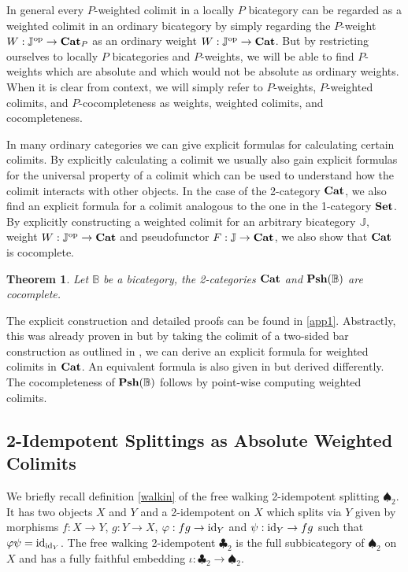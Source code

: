 \documentclass[12pt,oneside,reqno,a4paper]{article}
\newtheorem{theorem}{Theorem}[section]
\theoremstyle{definition}
\newcommand{\op}{^\textup{op}}
\newcommand{\Set}{\textbf{\textup{Set}}}
\newcommand{\Cat}{\textbf{\textup{Cat}}}
\newcommand{\Psh}[1]{\textbf{\textup{Psh}}(#1)}
\newcommand{\clb}{\clubsuit}
\newcommand{\spd}{\spadesuit}
\renewcommand{\phi}{\varphi}
\newcommand{\id}{\textup{id}}
\newcommand{\bB}{\mathbb{B}}
\newcommand{\bJ}{\mathbb{J}}
\begin{document}
In general every $P$-weighted colimit in a locally $P$ bicategory can be regarded as a weighted colimit in an ordinary bicategory by simply regarding the $P$-weight $W:\bJ\op\to\Cat_P$ as an ordinary weight $W:\bJ\op\to\Cat$. But by restricting ourselves to locally $P$ bicategories and $P$-weights, we will be able to find $P$-weights which are absolute and which would not be absolute as ordinary weights. When it is clear from context, we will simply refer to $P$-weights, $P$-weighted colimits, and $P$-cocompleteness as weights, weighted colimits, and cocompleteness. %

In many ordinary categories we can give explicit formulas for calculating certain colimits. By explicitly calculating a colimit we usually also gain explicit formulas for the universal property of a colimit which can be used to understand how the colimit interacts with other objects. In the case of the 2-category $\Cat$, we also find an explicit formula for a colimit analogous to the one in the 1-category $\Set$. By explicitly constructing a weighted colimit for an arbitrary bicategory $\bJ$, weight $W:\bJ\op\to\Cat$ and pseudofunctor $F:\bJ\to\Cat$, we also show that $\Cat$ is cocomplete.

\begin{theorem}
Let $\bB$ be a bicategory, the 2-categories $\Cat$ and $\Psh{\bB}$ are cocomplete.
\end{theorem}

The explicit construction and detailed proofs can be found in \ref{app1}. Abstractly, this was already proven in \cite{Kel} but by taking the colimit of a two-sided bar construction as outlined in \citep[12.]{S}, we can derive an explicit formula for weighted colimits in $\Cat$. An equivalent formula is also given in \cite{Lam} but derived differently. The cocompleteness of $\Psh{\bB}$ follows by point-wise computing weighted colimits.

\subsection{2-Idempotent Splittings as Absolute Weighted Colimits}

We briefly recall definition \ref{walkin} of the free walking 2-idempotent splitting $\spd_2$. It has two objects $X$ and $Y$ and a 2-idempotent on $X$ which splits via $Y$ given by morphisms $f:X\to Y$, $g:Y\to X$, $\phi:f g\to \id_Y$ and $\psi:\id_Y\to f g$ such that $\phi\psi=\id_{\id_Y}$. The free walking 2-idempotent $\clb_2$ is the full subbicategory of $\spd_2$ on $X$ and has a fully faithful embedding $\iota:\clb_2\to\spd_2$.
\end{document}
